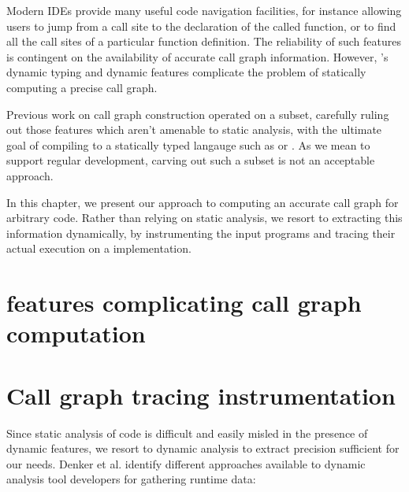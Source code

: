 Modern IDEs provide many useful code navigation facilities, for instance
allowing users to jump from a call site to the declaration of the called
function, or to find all the call sites of a particular function definition.
The reliability of such features is contingent on the availability of accurate
call graph information. However, \matlab's dynamic typing and dynamic features
complicate the problem of statically computing a precise call graph.

Previous work on \matlab call graph construction operated on a \matlab subset,
carefully ruling out those features which aren't amenable to static analysis,
with the ultimate goal of compiling \matlab to a statically typed langauge such
as \fortran or \xten \cite{Tamer}. As we mean to support regular \matlab
development, carving out such a subset is not an acceptable approach.

In this chapter, we present our approach to computing an accurate call graph
for arbitrary \matlab code. Rather than relying on static analysis, we resort
to extracting this information dynamically, by instrumenting the input programs
and tracing their actual execution on a \matlab implementation.

\section{\matlab features complicating call graph computation}

\section{Call graph tracing instrumentation}

Since static analysis of \matlab code is difficult and easily misled in the
presence of dynamic features, we resort to dynamic analysis to extract
precision sufficient for our needs. Denker et al.
\cite{AbstractionsForDynamicAnalysis} identify different approaches available
to dynamic analysis tool developers for gathering runtime data:

